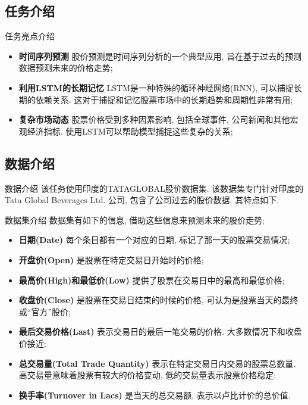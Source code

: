 \documentclass{beamer}
\begin{document}
\subsection{任务介绍}
\begin{frame}[fragile]{任务亮点介绍}
	\begin{itemize}
		\item \textbf{时间序列预测 }股价预测是时间序列分析的一个典型应用, 旨在基于过去的预测数据预测未来的价格走势;
		\item \textbf{利用LSTM的长期记忆 }LSTM是一种特殊的循环神经网络(RNN), 可以捕捉长期的依赖关系. 这对于捕捉和记忆股票市场中的长期趋势和周期性非常有用;
		\item \textbf{复杂市场动态 }股票价格受到多种因素影响, 包括全球事件, 公司新闻和其他宏观经济指标. 使用LSTM可以帮助模型捕捉这些复杂的关系;
	\end{itemize}
\end{frame}

\subsection{数据介绍}
\begin{frame}[fragile]{数据介绍}
	该任务使用印度的TATAGLOBAL股价数据集. 该数据集专门针对印度的Tata Global Beverages Ltd. 公司, 包含了公司过去的股价数据. 其特点如下.
\end{frame}

\begin{frame}[fragile]{数据集介绍}
	数据集有如下的信息, 借助这些信息来预测未来的股价走势;
	\begin{itemize}
		\item \textbf{日期(Date)} 每个条目都有一个对应的日期, 标记了那一天的股票交易情况;
		\item \textbf{开盘价(Open)} 是股票在特定交易日开始时的价格;
		\item \textbf{最高价(High)和最低价(Low)} 提供了股票在交易日中的最高和最低价格;
		\item \textbf{收盘价(Close)} 是股票在交易日结束的时候的价格, 可认为是股票当天的最终或``官方''股价;
		\item \textbf{最后交易价格(Last)} 表示交易日的最后一笔交易的价格. 大多数情况下和收盘价接近;
		\item \textbf{总交易量(Total Trade Quantity)} 表示在特定交易日内交易的股票总数量. 高交易量意味着股票有较大的价格变动, 低的交易量表示股票价格稳定;
		\item \textbf{换手率(Turnover in Lacs)} 是当天的总交易额, 表示以卢比计价的总价值.
	\end{itemize}
\end{frame}
\end{document}
